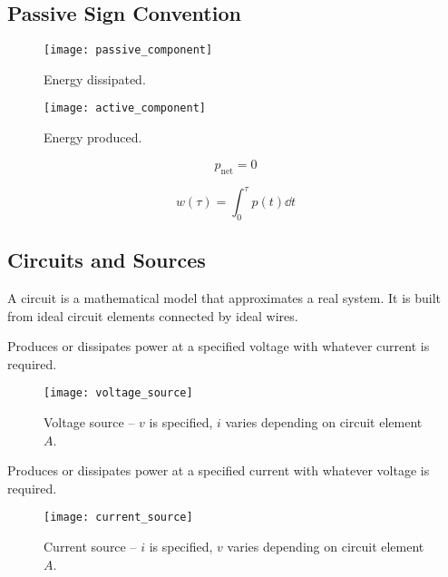 \documentclass{article}
\begin{document}
\subsection{Passive Sign Convention}
\begin{figure}[H]
    \centering
    \begin{minipage}[H]{0.48\textwidth}
        \centering
        \texttt{[image: passive\_component]}
        \caption{Energy dissipated.}
    \end{minipage}\hfill
    \begin{minipage}[H]{0.48\textwidth}
        \centering
        \texttt{[image: active\_component]}
        \caption{Energy produced.}
    \end{minipage}
\end{figure}
\begin{theorem}
    \begin{equation*}
        p_{\mathrm{net}} = 0
    \end{equation*}
\end{theorem}
\begin{theorem}[Energy]
    \begin{equation*}
        w\left( \tau \right) = \int_0^\tau p\left( t \right) \dd{t}
    \end{equation*}
\end{theorem}
\subsection{Circuits and Sources}
\begin{definition}[Circuits]
    A circuit is a mathematical model that approximates a real system. It is built from ideal circuit elements connected by ideal wires.
\end{definition}
\begin{definition}
    Produces or dissipates power at a specified voltage with whatever current is required.
\end{definition}
\begin{figure}[H]
    \centering
    \texttt{[image: voltage\_source]}
    \caption{Voltage source -- $v$ is specified, $i$ varies depending on circuit element $A$.}
\end{figure}
\begin{definition}
    Produces or dissipates power at a specified current with whatever voltage is required.
\end{definition}
\begin{figure}[H]
    \centering
    \texttt{[image: current\_source]}
    \caption{Current source -- $i$ is specified, $v$ varies depending on circuit element $A$.}
\end{figure}
\end{document}
